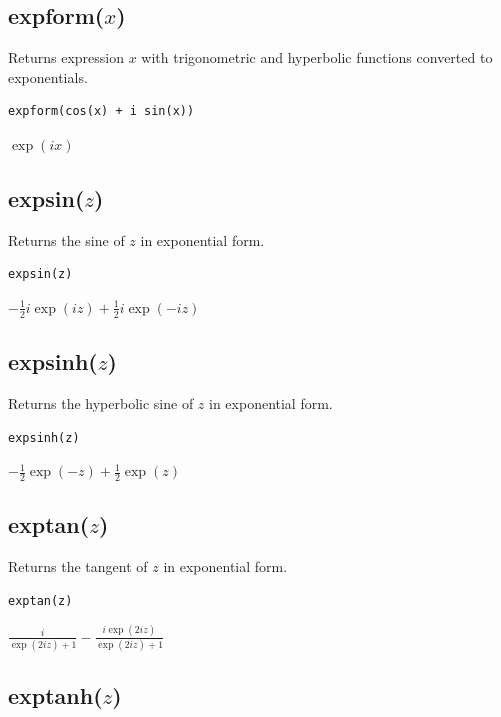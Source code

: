 \documentclass[12pt]{article}
\begin{document}
\subsection*{expform($x$)}

Returns expression $x$ with trigonometric and hyperbolic functions
converted to exponentials.

{\color{blue}
\begin{verbatim}
expform(cos(x) + i sin(x))
\end{verbatim}
}

\noindent
$\exp(ix)$

\subsection*{expsin($z$)}

Returns the sine of $z$ in exponential form.

{\color{blue}
\begin{verbatim}
expsin(z)
\end{verbatim}
}

\noindent
$\displaystyle -\tfrac{1}{2}i\exp(iz)+\tfrac{1}{2}i\exp(-iz)$

\subsection*{expsinh($z$)}

Returns the hyperbolic sine of $z$ in exponential form.

{\color{blue}
\begin{verbatim}
expsinh(z)
\end{verbatim}
}

\noindent
$\displaystyle -\tfrac{1}{2}\exp(-z)+\tfrac{1}{2}\exp(z)$

\subsection*{exptan($z$)}

Returns the tangent of $z$ in exponential form.

{\color{blue}
\begin{verbatim}
exptan(z)
\end{verbatim}
}

\noindent
$\displaystyle \frac{i}{\exp(2iz)+1}-\frac{i\exp(2iz)}{\exp(2iz)+1}$

\subsection*{exptanh($z$)}
\end{document}
